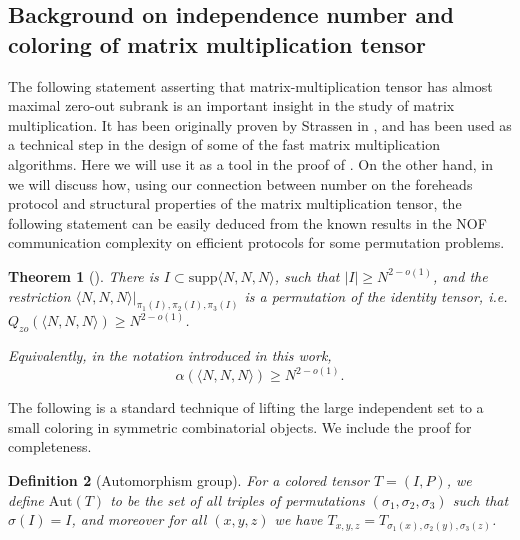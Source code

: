 \documentclass[10pt,a4paper]{article}
\newtheorem{theorem}{Theorem}
\newtheorem{definition}[theorem]{Definition}
\newcommand{\supp}{\mathrm{supp}}
\newcommand{\Aut}{\mathrm{Aut}}
\newcommand{\inprod}[1]{\langle #1 \rangle}
\begin{document}
\subsection{Background on independence number and coloring of matrix multiplication tensor}
The following statement asserting that matrix-multiplication tensor has almost maximal zero-out subrank is an important insight in the study of matrix multiplication. It has been originally proven by Strassen in \cite{S87}, and has been used as a technical step in the design of some of the fast matrix multiplication algorithms. Here we will use it as a tool in the proof of . On the other hand, in  we will discuss how, using our connection between number on the foreheads protocol and structural properties of the matrix multiplication tensor, the following statement can be easily deduced from the known results in the NOF communication complexity on efficient protocols for some permutation problems. 
\begin{theorem}[\cite{S87}]
There is $I \subset \supp{\inprod{N,N,N}}$, such that $|I| \geq N^{2 - o(1)}$, and the restriction $\inprod{N,N,N}|_{\pi_1(I), \pi_2(I), \pi_3(I)}$ is a permutation of the identity tensor, i.e. $Q_{zo}(\inprod{N,N,N}) \geq N^{2 - o(1)}$.

Equivalently, in the notation introduced in this work, 
\begin{equation*}
    \alpha(\inprod{N,N,N}) \geq N^{2 - o(1)}.
\end{equation*}
\end{theorem}

The following is a standard technique of lifting the large independent set to a small coloring in symmetric combinatorial objects. We include the proof for completeness.
\begin{definition}[Automorphism group]
    For a colored tensor $T = (I, P)$, we define $\Aut(T)$ to be the set of all triples of permutations $(\sigma_1, \sigma_2, \sigma_3)$ such that $\sigma(I) = I$, and moreover for all $(x,y,z)$ we have $T_{x,y,z} = T_{\sigma_1(x), \sigma_2(y), \sigma_3(z)}$.
\end{definition}
\end{document}
